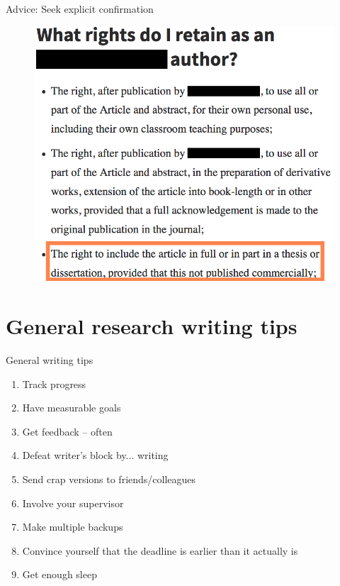 \documentclass[10pt]{beamer}
\begin{document}
\begin{frame}{Advice: Seek explicit confirmation}
	\begin{figure}
		\includegraphics[trim={0pt 0pt 0pt 0pt}, clip, width=0.9\columnwidth]{images/licenceFAQ002}
	\end{figure}
\end{frame}

\section{General research writing tips}

\begin{frame}{General writing tips}
\begin{enumerate}[<+- | alert@+>]
    \item Track progress
    \item Have measurable goals
    \item Get feedback -- often
    \item Defeat writer's block by... writing
    \item Send crap versions to friends/colleagues
    \item Involve your supervisor
    \item Make multiple backups
    \item Convince yourself that the deadline is earlier than it actually is
    \item Get enough sleep
\end{enumerate}
    
\end{frame}
\end{document}
